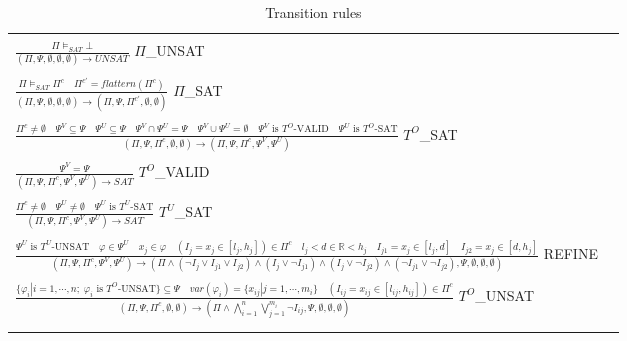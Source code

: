 \begin{table*}[t]
  \centering
  \begin{tabular}{ll}
  \hline\\
  \large 
  $\frac{\Pi \models_{SAT} \bot}{(\Pi, \Psi, \emptyset, \emptyset, \emptyset) \to UNSAT}$ \tiny $\Pi$\_UNSAT \\\\
  \large 
  $\frac{\Pi \models_{SAT} \Pi^c \quad \Pi^{c'} = flattern(\Pi^c)}{(\Pi, \Psi, \emptyset, \emptyset, \emptyset) \to (\Pi, \Psi, \Pi^{c'}, \emptyset, \emptyset)}$ \tiny $\Pi$\_SAT\\\\
  $\frac{\Pi^c \not= \emptyset \quad \Psi^V \subseteq \Psi \quad \Psi^U \subseteq \Psi \quad \Psi^V \cap \Psi^U = \Psi \quad \Psi^V \cup \Psi^U = \emptyset \quad \Psi^V \text{ is }  T^O\text{-VALID} \quad \Psi^U \text{ is }  T^O\text{-SAT}}{(\Pi, \Psi, \Pi^c, \emptyset, \emptyset) \to (\Pi, \Psi, \Pi^c, \Psi^V, \Psi^U)}$ \tiny $T^O$\_SAT \\\\  
  \large 
  $\frac{\Psi^V = \Psi}{(\Pi, \Psi, \Pi^c, \Psi^V, \Psi^U) \to SAT}$ \tiny $T^O$\_VALID \\\\
  \large 
  $\frac{\Pi^c \not= \emptyset \quad \Psi^U \not= \emptyset \quad \Psi^U \text{ is }  T^U\text{-SAT}}{(\Pi, \Psi, \Pi^c, \Psi^V, \Psi^U) \to SAT}$ \tiny $T^U$\_SAT \\\\
  \large 
  $\frac{\Psi^U \text{ is }  T^U\text{-UNSAT} \quad \varphi \in \Psi^U \quad x_j \in \varphi \quad (I_j = x_j \in [l_j, h_j]) \in \Pi^c \quad l_j < d \in \mathbb{R} < h_j \quad I_{j1} = x_j \in [l_j, d] \quad I_{j2} = x_j \in [d, h_j]}{(\Pi, \Psi, \Pi^c, \Psi^V, \Psi^U) \to (\Pi \wedge (\neg I_j \vee I_{j1} \vee I_{j2}) \wedge (I_j \vee \neg I_{j1}) \wedge (I_j \vee \neg I_{j2}) \wedge (\neg I_{j1} \vee \neg I_{j2}), \Psi, \emptyset, \emptyset, \emptyset)}$ \tiny REFINE \\\\
  \large 
  $\frac{\{\varphi_i| i = 1,\cdots, n; \; \varphi_i \text{ is } T^O\text{-UNSAT}\} \subseteq \Psi \quad var(\varphi_i) = \{x_{ij}|j=1,\cdots, m_i\} \quad (I_{ij} = x_{ij} \in [l_{ij}, h_{ij}]) \in \Pi^c}{(\Pi, \Psi, \Pi^c, \emptyset, \emptyset) \to (\Pi \wedge \bigwedge\limits_{i=1}^n \bigvee\limits_{j=1}^{m_i} \neg I_{ij}, \Psi, \emptyset, \emptyset, \emptyset)}$ \tiny $T^O$\_UNSAT \\\\
  \hline\\
  \end{tabular}
  \caption{Transition rules}\label{tab:transition-rules}
\end{table*}

